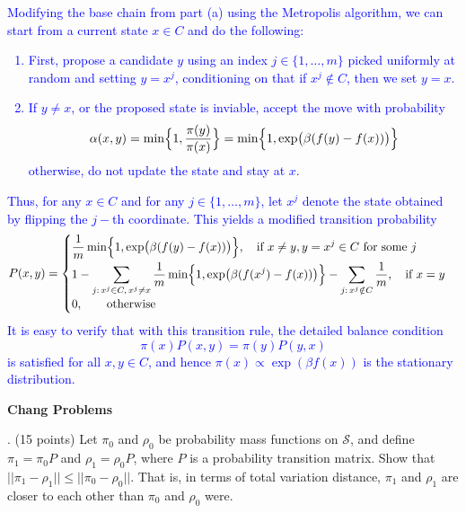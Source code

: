\documentclass{article}
\begin{document}
\begin{itemize}
    \textcolor{blue}{
Modifying the base chain from part (a) using the Metropolis algorithm, we can start from a current state \( x \in C \) and do the following:
\begin{enumerate}
    \item First, propose a candidate \( y \) using an index \( j \in \{1,\dots, m\} \) picked uniformly at random and setting \( y = x^j \), conditioning on that if \( x^j \notin C \), then we set \( y = x \).
    \item If \( y \neq x \), or the proposed state is inviable, accept the move with probability
    \[
    \alpha(x,y) = \min\Bigl\{ 1, \frac{\pi(y)}{\pi(x)} \Bigr\} 
    = \min\Bigl\{ 1, \exp\bigl(\beta (f(y)-f(x))\bigr) \Bigr\}
    \]
    otherwise, do not update the state and stay at \( x \).
\end{enumerate}
Thus, for any \( x\in C \) and for any \( j\in \{1,\dots,m\} \), let \( x^j \) denote the state obtained by flipping the \(j-\)th coordinate. This yields a modified transition probability
\[
P(x,y)=
\begin{cases}
\displaystyle \frac{1}{m}\min\Bigl\{1, \exp\bigl(\beta (f(y)-f(x))\bigr)\Bigr\}, \quad \text{if } x\neq y, y = x^j \in C \text{ for some } j \\[2mm]
\displaystyle 1 - \sum_{j:\, x^j \in C,\, x^j \neq x} \frac{1}{m}\min\Bigl\{1, \exp\bigl(\beta (f(x^j)-f(x))\bigr)\Bigr\} - \sum_{j:\, x^j \notin C} \frac{1}{m}, \quad \text{if } x =y\\[2mm]
0, \quad \quad \text{otherwise}
\end{cases}
\]
It is easy to verify that with this transition rule, the detailed balance condition
\[
\pi(x)P(x,y) = \pi(y)P(y,x)
\]
is satisfied for all \( x,y\in C \), and hence \(\pi(x) \propto \exp(\beta f(x))\) is the stationary distribution.
    }

\end{itemize}

\textbf{Chang Problems}

. (15 points) Let $\pi_0$ and $\rho_0$ be probability mass
functions on $\mathcal{S}$, and define $\pi_1 = \pi_0 P$ and $\rho_1 = \rho_0
P$, where $P$ is a probability transition matrix. Show that $||\pi_1 - \rho_1||
\leq ||\pi_0 - \rho_0||$. That is, in terms of total variation distance, $\pi_1$
and $\rho_1$ are closer to each other than $\pi_0$ and $\rho_0$ were.
\end{document}
